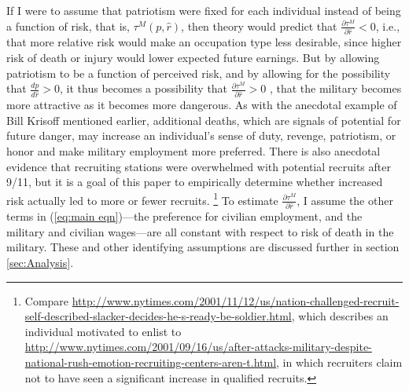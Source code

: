 \documentclass[12pt] {article}
\begin{document}
If I were to assume that patriotism were fixed for each individual
instead of being a function of risk, that is, $\tau^{M}(p,\hat{r})$,
then theory would predict that $\frac{\partial\tau^{M}}{\partial\hat{r}}<0$, i.e., 
that more relative risk would make an occupation type less desirable,
since higher risk of death or injury would lower expected future earnings.
But by allowing patriotism to be a function of perceived risk, and
by allowing for the possibility that $\frac{dp}{d\hat{r}}>0$, it
thus becomes a possibility that $\frac{\partial\tau^{M}}{\partial\hat{r}}>0$ ,
that the military becomes more attractive as it becomes more dangerous.
As with the anecdotal example of Bill Krisoff mentioned earlier, additional
deaths, which are signals of potential for future danger, may increase
an individual's sense of duty, revenge, patriotism, or honor and make
military employment more preferred. There is also anecdotal evidence
that recruiting stations were overwhelmed with potential recruits
after 9/11, but it is a goal of this paper to empirically determine
whether increased risk actually led to more or fewer recruits.%
\footnote{Compare \url{http://www.nytimes.com/2001/11/12/us/nation-challenged-recruit-self-described-slacker-decides-he-s-ready-be-soldier.html},
which describes an individual motivated to enlist to \url{http://www.nytimes.com/2001/09/16/us/after-attacks-military-despite-national-rush-emotion-recruiting-centers-aren-t.html},
in which recruiters claim not to have seen a significant increase
in qualified recruits.%
} To estimate $\frac{\partial\tau^{M}}{\partial\hat{r}}$, I assume the other terms
in (\ref{eq:main eqn})---the preference for civilian employment,
and the military and civilian wages---are all constant with respect
to risk of death in the military. These and other identifying assumptions
are discussed further in section \ref{sec:Analysis}.
\end{document}
